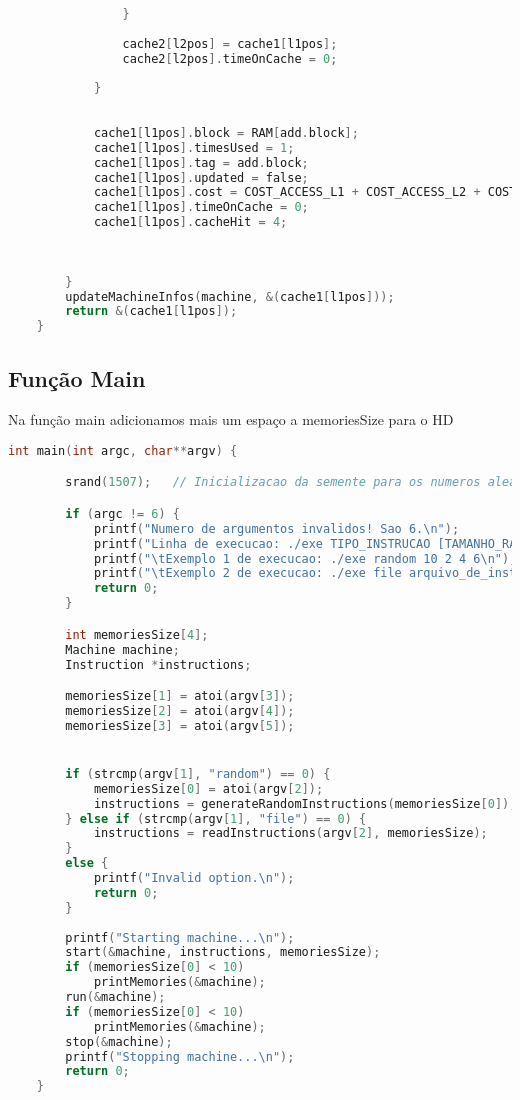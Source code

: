 \documentclass{article}
\begin{document}
\begin{lstlisting}[caption={Função MMUSearchOnMemorys},label={lst:cod6},language=C]
    
                }
    
                cache2[l2pos] = cache1[l1pos];
                cache2[l2pos].timeOnCache = 0;
    
            }
    
            
            cache1[l1pos].block = RAM[add.block];
            cache1[l1pos].timesUsed = 1;
            cache1[l1pos].tag = add.block;
            cache1[l1pos].updated = false;
            cache1[l1pos].cost = COST_ACCESS_L1 + COST_ACCESS_L2 + COST_ACCESS_L3 + COST_ACCESS_RAM;
            cache1[l1pos].timeOnCache = 0;
            cache1[l1pos].cacheHit = 4;
    
    
    
        }
        updateMachineInfos(machine, &(cache1[l1pos]));
        return &(cache1[l1pos]);
    }

\end{lstlisting}

\clearpage

\subsection{Função Main}

Na função main adicionamos mais um espaço a memoriesSize para o HD

\begin{lstlisting}[caption={Main},label={lst:cod6},language=C]
    int main(int argc, char**argv) {

        srand(1507);   // Inicializacao da semente para os numeros aleatorios.

        if (argc != 6) {
            printf("Numero de argumentos invalidos! Sao 6.\n");
            printf("Linha de execucao: ./exe TIPO_INSTRUCAO [TAMANHO_RAM|ARQUIVO_DE_INSTRUCOES] TAMANHO_L1 TAMANHO_L2 TAMANHO_L3\n");
            printf("\tExemplo 1 de execucao: ./exe random 10 2 4 6\n");
            printf("\tExemplo 2 de execucao: ./exe file arquivo_de_instrucoes.txt\n");
            return 0;
        }

        int memoriesSize[4];
        Machine machine;
        Instruction *instructions;

        memoriesSize[1] = atoi(argv[3]);
        memoriesSize[2] = atoi(argv[4]);
        memoriesSize[3] = atoi(argv[5]);


        if (strcmp(argv[1], "random") == 0) {
            memoriesSize[0] = atoi(argv[2]);
            instructions = generateRandomInstructions(memoriesSize[0]);
        } else if (strcmp(argv[1], "file") == 0) {
            instructions = readInstructions(argv[2], memoriesSize);
        } 
        else {
            printf("Invalid option.\n");
            return 0;
        }
        
        printf("Starting machine...\n");
        start(&machine, instructions, memoriesSize);
        if (memoriesSize[0] < 10)
            printMemories(&machine);
        run(&machine);
        if (memoriesSize[0] < 10)
            printMemories(&machine);
        stop(&machine);
        printf("Stopping machine...\n");
        return 0;
    }
\end{lstlisting}
\clearpage
\end{document}
